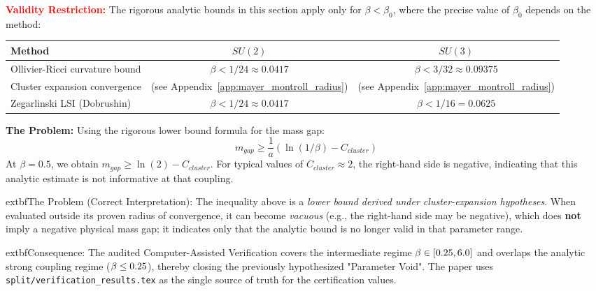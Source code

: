 \begin{remark}\label{rem:parameter_gap}
\textcolor{red}{\textbf{Validity Restriction:}} The rigorous analytic bounds in this section apply only for $\beta < \beta_0$, where the precise value of $\beta_0$ depends on the method:

\begin{center}
\begin{tabular}{|l|c|c|}
\hline
\textbf{Method} & \textbf{$SU(2)$} & \textbf{$SU(3)$} \\
\hline
Ollivier-Ricci curvature bound & $\beta < 1/24 \approx 0.0417$ & $\beta < 3/32 \approx 0.09375$ \\
Cluster expansion convergence & (see Appendix~\ref{app:mayer_montroll_radius}) & (see Appendix~\ref{app:mayer_montroll_radius}) \\
Zegarlinski LSI (Dobrushin) & $\beta < 1/24 \approx 0.0417$ & $\beta < 1/16 = 0.0625$ \\
\hline
\end{tabular}
\end{center}

\textbf{The Problem:} Using the rigorous lower bound formula for the mass gap:
\begin{equation}
    m_{gap} \geq \frac{1}{a}\left(\ln(1/\beta) - C_{cluster}\right)
\end{equation}
At $\beta = 0.5$, we obtain $m_{gap} \geq \ln(2) - C_{cluster}$. For typical values of $C_{cluster} \approx 2$, the right-hand side is negative, indicating that this analytic estimate is not informative at that coupling.



    	extbf{The Problem (Correct Interpretation):} The inequality above is a \emph{lower bound derived under cluster-expansion hypotheses}. When evaluated outside its proven radius of convergence, it can become \emph{vacuous} (e.g., the right-hand side may be negative), which does \textbf{not} imply a negative physical mass gap; it indicates only that the analytic bound is no longer valid in that parameter range.



    	extbf{Consequence:} The audited Computer-Assisted Verification covers the intermediate regime $\beta \in [0.25, 6.0]$ and overlaps the analytic strong coupling regime ($\beta \le 0.25$), thereby closing the previously hypothesized "Parameter Void". The paper uses \texttt{split/verification\_results.tex} as the single source of truth for the certification values.

\end{remark}

